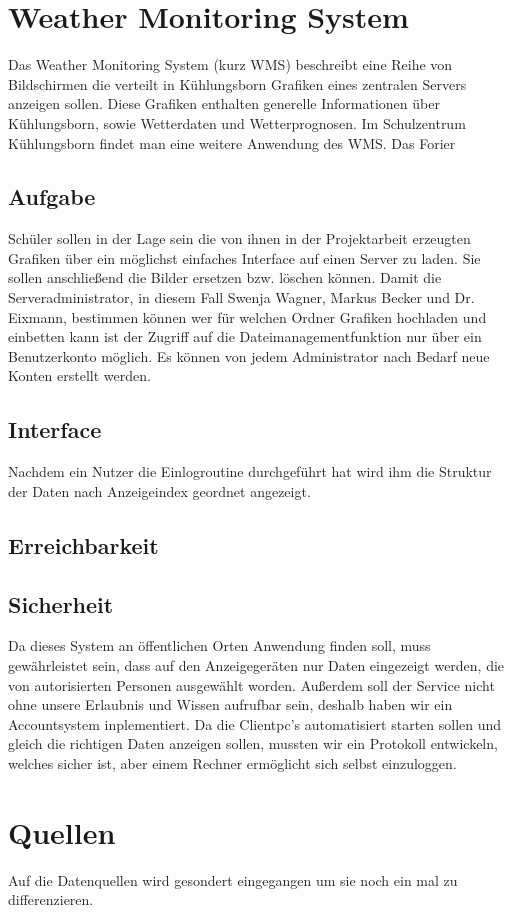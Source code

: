 \documentclass[a4paper,oneside,10pt,titlepage]{article}
\begin{document}
\section{Weather Monitoring System}
Das Weather Monitoring System (kurz WMS) beschreibt eine Reihe von Bildschirmen die verteilt in Kühlungsborn Grafiken eines zentralen Servers anzeigen sollen. Diese Grafiken enthalten generelle Informationen über Kühlungsborn, sowie Wetterdaten und Wetterprognosen. Im Schulzentrum Kühlungsborn findet man eine weitere Anwendung des WMS. Das Forier
\subsection{Aufgabe}
Schüler sollen in der Lage sein die von ihnen in der Projektarbeit erzeugten Grafiken über ein möglichst einfaches Interface auf einen Server zu laden. Sie sollen anschließend die Bilder ersetzen bzw. löschen können. Damit die Serveradministrator, in diesem Fall Swenja Wagner, Markus Becker und Dr. Eixmann, bestimmen können wer für welchen Ordner Grafiken hochladen und einbetten kann ist der Zugriff auf die Dateimanagementfunktion nur über ein Benutzerkonto möglich. Es können von jedem Administrator nach Bedarf neue Konten erstellt werden.
\subsection{Interface}
Nachdem ein Nutzer die Einlogroutine durchgeführt hat wird ihm die Struktur der Daten nach Anzeigeindex geordnet angezeigt.
\subsection{Erreichbarkeit}
\subsection{Sicherheit}
Da dieses System an öffentlichen Orten Anwendung finden soll, muss gewährleistet sein, dass auf den Anzeigegeräten nur Daten eingezeigt werden, die von autorisierten Personen ausgewählt worden. Außerdem soll der Service nicht ohne unsere Erlaubnis und Wissen aufrufbar sein, deshalb haben wir ein Accountsystem inplementiert. Da die Clientpc's automatisiert starten sollen und gleich die richtigen Daten anzeigen sollen, mussten wir ein Protokoll entwickeln, welches sicher ist, aber einem Rechner ermöglicht sich selbst einzuloggen.
\section{Quellen}
Auf die Datenquellen wird gesondert eingegangen um sie noch ein mal zu differenzieren.
\end{document}
